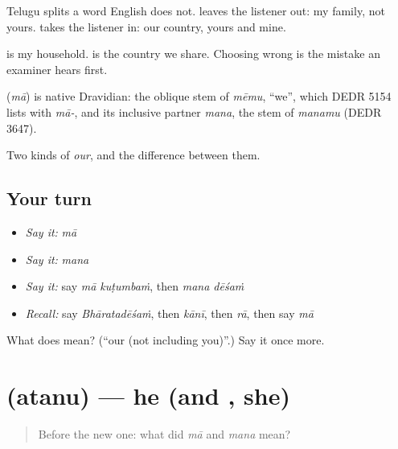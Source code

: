 Telugu splits a word English does not. \textbf{} leaves the listener out: my family, not yours. \textbf{} takes the listener in: our country, yours and mine.

\textbf{ } is my household. \textbf{ } is the country we share. Choosing wrong is the mistake an examiner hears first.

\begin{cousinweb}
\textbf{} (\emph{mā}) is native Dravidian: the oblique stem of \emph{mēmu}, \textquotedblleft{}we\textquotedblright{}, which DEDR 5154 lists with \emph{mā-}, and its inclusive partner \emph{mana}, the stem of \emph{manamu} (DEDR 3647).
\end{cousinweb}

\begin{grammarlens}[title={What you've built}]
Two kinds of \emph{our}, and the difference between them.
\end{grammarlens}

\subsection*{Your turn}
\begin{itemize}
\raggedright
  \item \emph{Say it:} \emph{mā}
  \item \emph{Say it:} \emph{mana}
  \item \emph{Say it:} say \emph{mā kuṭumbaṁ}, then \emph{mana dēśaṁ}
  \item \emph{Recall:} say \emph{Bhāratadēśaṁ}, then \emph{kānī}, then \emph{rā}, then say \emph{mā}
\end{itemize}

\begin{tcolorbox}[breakable,colback=teal!4,colframe=teal!35!black,title={Before you move on}]
What does  mean? (\textquotedblleft{}our (not including you)\textquotedblright{}.) Say it once more.
\end{tcolorbox}
\section[\texorpdfstring{\te{అతను} (atanu)}{అతను (atanu)}]{ (atanu) — he (and , she)}

\label{lesson:TE-C79-he}



\begin{quote}
Before the new one: what did \emph{mā} and \emph{mana} mean?
\end{quote}

